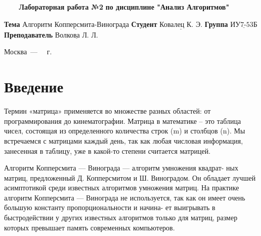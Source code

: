 \documentclass[a4paper,14pt, unknownkeysallowed]{extreport}
\begin{document}
\begin{titlepage}
	
	\begin{center}
		\noindent\begin{minipage}{1.3\textwidth}\centering
		\Large\textbf{   ~~~ Лабораторная работа №2}\newline
		\textbf{по дисциплине "Анализ Алгоритмов"}\newline\newline\newline
		\end{minipage}
	\end{center}
	
	\noindent\textbf{Тема} 			$\underline{\text{Алгоритм Копперсмита-Винограда}}$\newline\newline
	\noindent\textbf{Студент} 		$\underline{\text{Ковалец К. Э.}}$\newline\newline
	\noindent\textbf{Группа} 		$\underline{\text{ИУ7-53Б}}$\newline\newline
	\noindent\textbf{Преподаватель} $\underline{\text{Волкова Л. Л.}}$\newline
	
	\begin{center}
		\vfill
		Москва~---~\the\year
		~г.
	\end{center}
	\restoregeometry
\end{titlepage}



\renewcommand{\contentsname}{Содержание} 
\tableofcontents
\setcounter{page}{2}





\chapter*{Введение}

Термин «матрица» применяется во множестве разных областей: от
программирования до кинематографии. Матрица в математике – это таблица чисел, состоящая из определенного количества строк (m) и столбцов (n). Мы встречаемся с матрицами каждый день, так как любая числовая информация, занесенная в таблицу, уже в какой-то степени считается матрицей.

Алгоритм Копперсмита — Винограда — алгоритм умножения квадрат- ных матриц, предложенный Д. Копперсмитом и Ш. Виноградом. Он обладает лучшей асимптотикой среди известных алгоритмов умножения матриц. На практике алгоритм Копперсмита — Винограда не используется, так как он имеет очень большую константу пропорциональности и начина- ет выигрывать в быстродействии у других известных алгоритмов только для матриц, размер которых превышает память современных компьютеров.
\end{document}
